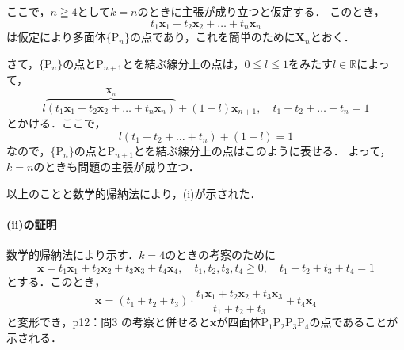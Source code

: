 \begin{tproof}
  ここで，$n \geqq 4$として$k=n$のときに主張が成り立つと仮定する．
  このとき，
  \[
    t_1 \bm{x}_1 + t_2 \bm{x}_2+\dots+ t_n \bm{x}_n
  \]
  は仮定により多面体$\{ \mathrm{P}_n \}$の点であり，これを簡単のために$\bm{X}_n$とおく．

  さて，$\{ \mathrm{P}_n \}$の点と$\mathrm{P}_{n+1}$とを結ぶ線分上の点は，$ 0 \leqq l \leqq 1$をみたす$l \in \mathbb{R}$によって，
  \[
    l \overbrace{(  t_1 \bm{x}_1 + t_2 \bm{x}_2+\dots+ t_n \bm{x}_n)}^{\bm{X}_n}+(1-l) \bm{x}_{n+1} , \quad t_1+t_2+\dots + t_n =1
  \]
  とかける．ここで，
  \[
    l(t_1+t_2+\dots+t_n)+(1-l)=1
  \]
  なので，$\{ \mathrm{P}_n \}$の点と$\mathrm{P}_{n+1}$とを結ぶ線分上の点はこのように表せる．
  よって，$k=n$のときも問題の主張が成り立つ．

  以上のことと数学的帰納法により，(i)が示された．

  \paragraph{(ii)の証明}
  数学的帰納法により示す．$k=4$のときの考察のために
  \[
    \bm{x} = t_1 \bm{x}_1 + t_2 \bm{x}_2 + t_3 \bm{x}_3 + t_4 \bm{x}_4 ,\quad t_1, t_2 ,t_3 ,t_4 \geqq 0 ,\quad  t_1 +t_2 + t_3 + t_4 =1
  \]
  とする．このとき，
  \[
    \bm{x} =(t_1+t_2+t_3) \cdot \frac{t_1 \bm{x}_1 + t_2 \bm{x}_2 + t_3 \bm{x}_3}{t_1+t_2+t_3}  + t_4 \bm{x}_4
  \]
  と変形でき，p12：問3 の考察と併せると$\bm{x}$が四面体$\mathrm{P_1 P_2 P_3 P_4}$の点であることが示される．


\end{tproof}
